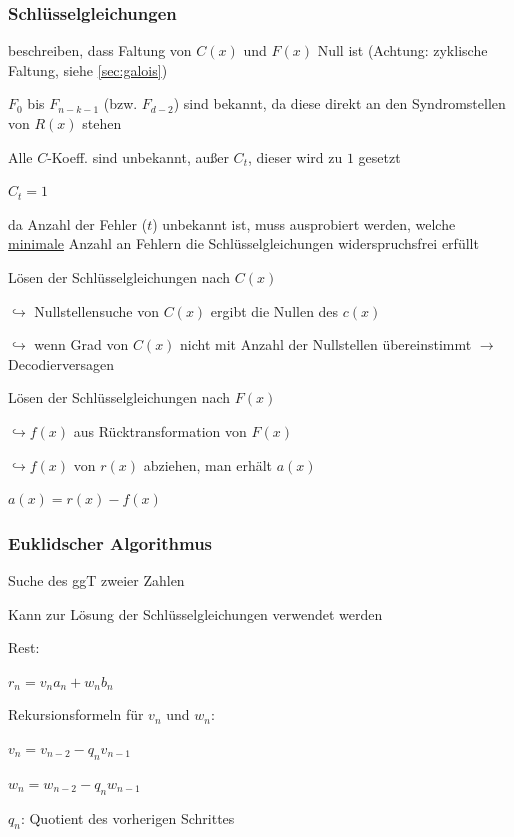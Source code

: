 \subsubsection{Schlüsselgleichungen}

beschreiben, dass Faltung von $C(x)$ und $F(x)$ Null ist (Achtung: zyklische Faltung, siehe \autoref{sec:galois})

$F_0$ bis $F_{n-k-1}$ (bzw. $F_{d-2}$) sind bekannt, da diese direkt an den Syndromstellen
von $R(x)$ stehen

Alle $C$-Koeff. sind unbekannt, außer $C_{t}$, dieser wird zu $1$ gesetzt

$\displaystyle{
    C_{t} = 1
}$

da Anzahl der Fehler ($t$) unbekannt ist, muss ausprobiert werden, welche \underline{minimale} Anzahl an Fehlern
die Schlüsselgleichungen widerspruchsfrei erfüllt

Lösen der Schlüsselgleichungen nach $C(x)$

$\hookrightarrow$ Nullstellensuche von $C(x)$ ergibt die Nullen des $c(x)$

$\hookrightarrow$ wenn Grad von $C(x)$ nicht mit Anzahl der Nullstellen übereinstimmt $\rightarrow$ Decodierversagen

Lösen der Schlüsselgleichungen nach $F(x)$

$\hookrightarrow f(x)$ aus Rücktransformation von $F(x)$

$\hookrightarrow f(x)$ von $r(x)$ abziehen, man erhält $a(x)$

$\displaystyle{
    a(x) = r(x) - f(x)
}$


\subsubsection{Euklidscher Algorithmus}

Suche des ggT zweier Zahlen

Kann zur Lösung der Schlüsselgleichungen verwendet werden

Rest:

$\displaystyle{
    r_n = v_n a_n + w_n b_n
}$

Rekursionsformeln für $v_n$ und $w_n$:

$\displaystyle{
    v_n = v_{n-2} - q_n v_{n-1}
}$

$\displaystyle{
    w_n = w_{n-2} - q_n w_{n-1}
}$

$q_n$: Quotient des vorherigen Schrittes

